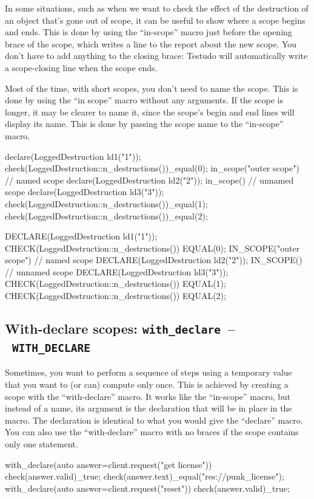 \documentclass[twoside, a4paper, article]{memoir}
\newcommand*\testudocolor{\color{red!80!blue}}
\newcommand*\testudo[1]{\texttt{\testudocolor{}#1}}
\newcommand*\testudopair[2]{\testudo{#1}~--~\testudo{#2}}
\newcommand\subsectiontestudopair[3]{%
  \subsection[#1]{#1: \testudopair{#2}{#3}}}
\begin{document}
In some situations, such as when we want to check the effect of the destruction
of an object that's gone out of scope, it can be useful to show where a scope
begins and ends.  This is done by using the ``in-scope'' macro just before the
opening brace of the scope, which writes a line to the report about the new
scope.  You don't have to add anything to the closing brace: Testudo will
automatically write a scope-closing line when the scope ends.

Most of the time, with short scopes, you don't need to name the scope.  This is
done by using the ``in scope'' macro without any arguments.  If the scope is
longer, it may be clearer to name it, since the scope's begin and end lines
will display its name.  This is done by passing the scope name to the
``in-scope'' macro.

\begin{cpplisting}
declare(LoggedDestruction ld1("1"));
check(LoggedDestruction::n_destructions())_equal(0);
in_scope("outer scope") { // named scope
  declare(LoggedDestruction ld2("2"));
  in_scope() { // unnamed scope
    declare(LoggedDestruction ld3("3"));
  }
  check(LoggedDestruction::n_destructions())_equal(1);
}
check(LoggedDestruction::n_destructions())_equal(2);
\end{cpplisting}

\begin{cpplisting}
DECLARE(LoggedDestruction ld1("1"));
CHECK(LoggedDestruction::n_destructions()) EQUAL(0);
IN_SCOPE("outer scope") // named scope
{
  DECLARE(LoggedDestruction ld2("2"));
  IN_SCOPE() // unnamed scope
  {
    DECLARE(LoggedDestruction ld3("3"));
  }
  CHECK(LoggedDestruction::n_destructions()) EQUAL(1);
}
CHECK(LoggedDestruction::n_destructions()) EQUAL(2);
\end{cpplisting}

\subsectiontestudopair{With-declare scopes}{with\_declare}{WITH\_DECLARE}
\label{sec:with-declare-scopes}

Sometimes, you want to perform a sequence of steps using a temporary value that
you want to (or can) compute only once.  This is achieved by creating a scope
with the ``with-declare'' macro.  It works like the ``in-scope'' macro, but
instead of a name, its argument is the declaration that will be in place in the
macro.  The declaration is identical to what you would give the ``declare''
macro.  You can also use the ``with-declare'' macro with no braces if the scope
contains only one statement.

\begin{cpplisting}
with_declare(auto answer=client.request("get license")) {
  check(answer.valid)_true;
  check(answer.text)_equal("res://punk_license");
}
with_declare(auto answer=client.request("reset"))
  check(answer.valid)_true;
\end{cpplisting}
\end{document}
